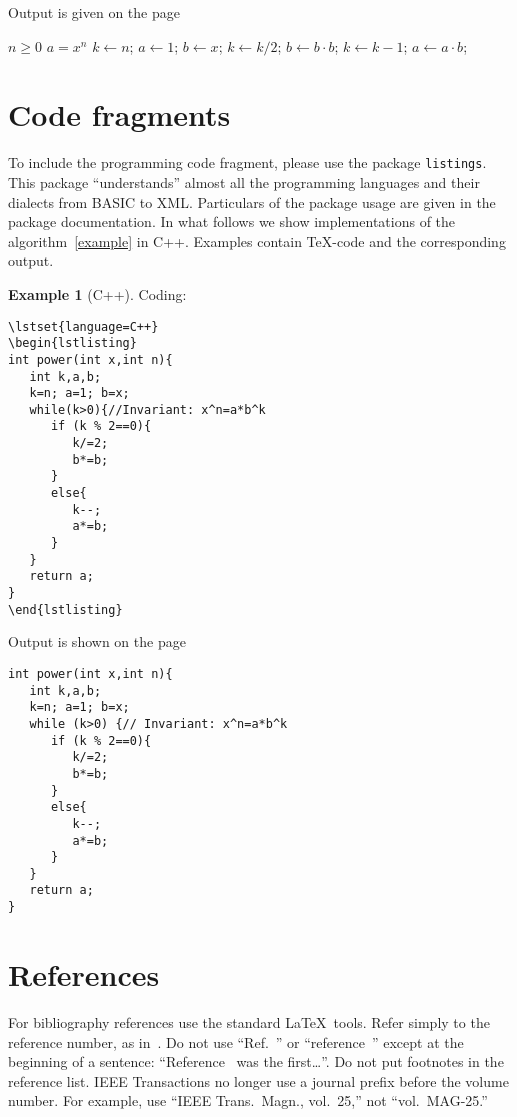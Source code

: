 \documentclass[conference]{IEEEtran}
\theoremstyle{definition}
\newtheorem{example}[remark]{Example}
\begin{document}
Output is given on the page~\pageref{example}
\begin{algorithm}[tbp]
\caption{Calculating $x$ to the 
power~$n$\label{example}}
\begin{algorithmic}[2]
\REQUIRE $n\ge 0$
\ENSURE $a=x^n$
\STATE $k\leftarrow n$; $a\leftarrow 1$; 
\STATE $b\leftarrow x$;
\STATE $k\leftarrow k/2$;
\STATE $b\leftarrow b\cdot b$;
\ELSE[$k$ is odd]
\STATE $k\leftarrow k-1$;
\STATE $a\leftarrow a\cdot b$;
\ENDIF
\ENDWHILE
\end{algorithmic}
\end{algorithm}


\section{Code fragments}
To include the programming code fragment, please use the package \verb|listings|. This package ``understands'' almost all the programming languages and their dialects from BASIC to XML. Particulars of the package usage are given in the package documentation. In what follows we show implementations of the algorithm~\ref{example} in C++. Examples contain \TeX-code and the corresponding output.

\begin{example}[C++]
Coding:
\begin{verbatim}
\lstset{language=C++}
\begin{lstlisting}
int power(int x,int n){
   int k,a,b;
   k=n; a=1; b=x;
   while(k>0){//Invariant: x^n=a*b^k
      if (k % 2==0){
         k/=2;
         b*=b;
      }
      else{
         k--;
         a*=b;
      }
   }
   return a;
}
\end{lstlisting}
\end{verbatim}
Output is shown on the page~\pageref{c++}
\begin{algorithm}[tbp]
\caption{Calculating $x$ to the 
power~$n$ in C++\label{c++}}
\lstset{language=C++}
\begin{lstlisting}
int power(int x,int n){
   int k,a,b;
   k=n; a=1; b=x;
   while (k>0) {// Invariant: x^n=a*b^k
      if (k % 2==0){
         k/=2;
         b*=b;
      }
      else{
         k--;
         a*=b;
      }
   }
   return a;
}
\end{lstlisting}
\end{algorithm}
\end{example}



\section{References}
For bibliography references use the standard \LaTeX\ tools. Refer simply to the reference number, as in~\cite{c3}. Do not use ``Ref.~\cite{c3}'' or ``reference~\cite{c3}'' except at the beginning of a sentence:  ``Reference~\cite{c3} was the first\dots''. Do not put footnotes in the reference list. IEEE Transactions no longer use a journal prefix before the volume number.  For example, use ``IEEE Trans.\ Magn., vol.~25,'' not ``vol.~MAG-25.''
\end{document}
